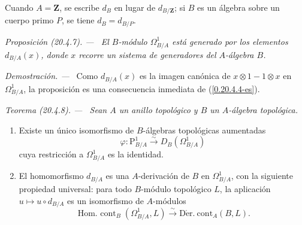\documentclass[10pt,oneside]{book}
\makeatletter
\newcommand{\sref}[1]{\textup{(\ref{#1})}}
\newcommand{\setmanualcurrentlabel}[1]{\def\@currentlabel{#1}}
\newenvironment{proposition}[1][]{%
  \setmanualcurrentlabel{#1}\par\medskip\noindent\itshape Proposición (#1). ---\ }{\par}
\newenvironment{theorem}[1][]{%
  \setmanualcurrentlabel{#1}\par\medskip\noindent\itshape Teorema (#1). ---\ }{\par}
\newenvironment{proof}{%
  \par\medskip\noindent\textit{Demostración. ---\ }}{\par}
\providecommand{\setmin}{-}%
\makeatother
\begin{document}
Cuando $A=\mathbf{Z}$, se escribe $d_B$ en lugar de $d_{B/\mathbf{Z}}$; si $B$
es un álgebra sobre un cuerpo primo $P$, se tiene $d_B=d_{B/P}$.

\begin{proposition}[20.4.7]
\label{0.20.4.7-es}
El $B$-módulo $\Omega^1_{B/A}$ está generado por los elementos $d_{B/A}(x)$,
donde $x$ recorre un sistema de generadores del $A$-álgebra $B$.
\end{proposition}

\begin{proof}
Como $d_{B/A}(x)$ es la imagen canónica de $x\otimes1\setmin 1\otimes x$ en
$\Omega^1_{B/A}$, la proposición es una consecuencia inmediata de
\sref{0.20.4.4-es}.
\end{proof}

\begin{theorem}[20.4.8]
\label{0.20.4.8-es}
Sean $A$ un anillo topológico y $B$ un $A$-álgebra topológica.
\begin{enumerate}
  \item[\rm(i)] Existe un único isomorfismo de $B$-álgebras topológicas
  aumentadas
\begin{equation}
\tag{20.4.8.1}
\label{0.20.4.8.1-es}
  \varphi:\mathrm{P}^1_{B/A}\xrightarrow{\sim}D_B(\Omega^1_{B/A})
\end{equation}
cuya restricción a $\Omega^1_{B/A}$ es la identidad.
  \item[\rm(ii)] El homomorfismo $d_{B/A}$ es una $A$-derivación de $B$
  en $\Omega^1_{B/A}$, con la siguiente propiedad universal: para todo
  $B$-módulo topológico $L$, la aplicación $u\mapsto u\circ d_{B/A}$ es
  un isomorfismo de $A$-módulos
\begin{equation}
\tag{20.4.8.2}
\label{0.20.4.8.2-es}
  \operatorname{Hom.\ cont}_B(\Omega^1_{B/A},L)
  \xrightarrow{\sim}\operatorname{D\acute{e}r.\ cont}_A(B,L).
\end{equation}
\end{enumerate}
\end{theorem}
\end{document}
